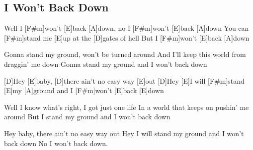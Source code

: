 \subsection*{I Won't Back Down   }



\begin{guitar}


Well I [F#m]won't [E]back [A]down, no I [F#m]won't [E]back [A]down
You can [F#m]stand me [E]up at the [D]gates of hell
But I [F#m]won't [E]back [A]down


Gonna stand my ground, won't be turned around
And I'll keep this world from draggin' me down
Gonna stand my ground and I won't back down


[D]Hey [E]baby, [D]there ain't no easy way [E]out
[D]Hey [E]I will [F#m]stand [E]my [A]ground and I [F#m]won't [E]back [E]down


Well I know what's right, I got just one life
In a world that keeps on pushin' me around
But I stand my ground and I won't back down

Hey baby, there ain't no easy way out
Hey I will stand my ground and I won't back down
No I won't back down.
\end{guitar}
